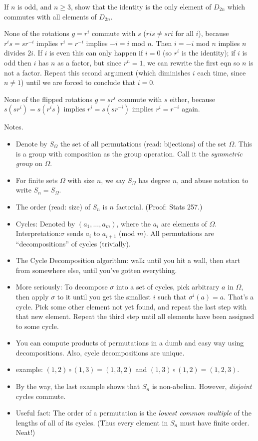 \documentclass[1    0pt, answers]{exam} \renewcommand{\baselinestretch}{1.05}
\theoremstyle{plain}
\theoremstyle{definition}
\begin{document}
\begin{questions}
\question If $n$ is odd, and $n \geq 3$, show that the identity is the only element of $D_{2n}$ which commutes with all elements of $D_{2n}$.

\begin{solution}
None of the rotations $g = r^i$ commute with $s$ ($ri s \neq s ri$ for all $i$), because $r^i s = s r^{-i}$ implies $r^i = r^{-i}$ implies $-i = i$ mod $n$. Then $i = -i$ mod $n$ implies $n$ divides $2i$. If $i$ is even this can only happen if $i = 0$ (so $r^i$ is the identity); if $i$ is odd then $i$ has $n$ as a factor, but since $r^n = 1$, we can rewrite the first eqn so $n$ is not a factor. Repeat this second argument (which diminishes $i$ each time, since $n \neq 1$) until we are forced to conclude that $i = 0$.

None of the flipped rotations $g = sr^i$ commute with $s$ either, because $s (s r^i) = s (r^i s)$ implies $r^i = s (s r^{-i})$ implies $r^i = r^{-i}$ again.
\end{solution}

Notes.
\begin{itemize}
    \item Denote by $S_{\Omega}$ the set of all permutations (read: bijections) of the set $\Omega$. This is a group with composition as the group operation. Call it the \emph{symmetric group} on $\Omega$.
    \item For finite sets $\Omega$ with size $n$, we say $S_{\Omega}$ has degree $n$, and abuse notation to write $S_n = S_{\Omega}$.
    \item The order (read: size) of $S_n$ is $n$ factorial. (Proof: Stats 257.)
    \item Cycles: Denoted by $(a_1, \ldots, a_m)$, where the $a_i$ are elements of $\Omega$. Interpretation:$\sigma$ sends $a_i$ to $a_{i + 1}$ (mod $m$). All permutations are ``decompositions'' of cycles (trivially).
    \item The Cycle Decomposition algorithm: walk until you hit a wall, then start from somewhere else, until you've gotten everything. 
    \item More seriously: To decompose $\sigma$ into a set of cycles, pick arbitrary $a$ in $\Omega$, then apply $\sigma$ to it until you get the smallest $i$ such that $\sigma^i(a) = a$. That's a cycle. Pick some other element not yet found, and repeat the last step with that new element. Repeat the third step until all elements have been assigned to some cycle.
    \item You can compute products of permutations in a dumb and easy way using decompositions. Also, cycle decompositions are unique.
    \item example: $(1,2) \circ (1,3) = (1, 3, 2)$ and $(1, 3) \circ (1, 2) = (1, 2, 3)$.
    \item By the way, the last example shows that $S_n$ is non-abelian. However, \emph{disjoint} cycles commute.
    \item Useful fact: The order of a permutation is the \emph{lowest common multiple} of the lengths of all of its cycles. (Thus every element in $S_n$ must have finite order. Neat!)
\end{itemize}


\end{questions}
\end{document}
